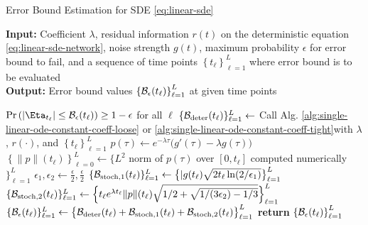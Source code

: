     \begin{algorithm}[!htbp]
        \caption{Error Bound Estimation for SDE \eqref{eq:linear-sde}}\label{alg:sde}
        \textbf{Input:} Coefficient $\lambda$, residual information $r(t)$ on the deterministic equation \eqref{eq:linear-sde-network}, noise strength $g(t)$, maximum probability $\epsilon$ for error bound to fail, and a sequence of time points $\left\{t_\ell\right\}_{\ell=1}^{L}$ where error bound is to be evaluated\\
        \textbf{Output:} Error bound values $\left\{\mathcal{B}_\epsilon(t_\ell)\right\}_{\ell=1}^{L}$ at given time points
        \begin{algorithmic}
            \Ensure $\P{\left|\Eta_{t_\ell}\right| \leq \Bound_\epsilon(t_\ell)} \geq 1 - \epsilon$ for all $\ell$
            \State $\{\mathcal{B}_{\text{deter}}(t_\ell)\}_{\ell=1}^{L} \gets $ {\small Call Alg. }\ref{alg:single-linear-ode-constant-coeff-loose} {\small or }\ref{alg:single-linear-ode-constant-coeff-tight}{\small with } $\lambda${\small, }$r(\cdot)${\small, and }$\left\{t_\ell\right\}_{\ell=1}^{L}$
            \State $p(\tau) \gets e^{-\lambda\tau}\big(g'(\tau) - \lambda g(\tau)\big)$
            \State $\left\{\|p\| (t_\ell)\right\}_{\ell=0}^L \gets \{L^2$ {\small norm of} $p(\tau)$ {\small over} $[0, t_\ell]$ {\small computed numerically} $\}_{\ell=1}^{L}$
            \State $\epsilon_1, \epsilon_2 \gets \frac{\epsilon}{2}, \frac{\epsilon}{2}$ 
            \State $\{\mathcal{B}_{\text{stoch}, 1}(t_\ell)\}_{\ell=1}^{L} \gets \big\{|g(t_\ell) \sqrt{2t_\ell \ln(2/\epsilon_1)}\big\}_{\ell=1}^{L}$
            \State $\{\mathcal{B}_{\text{stoch}, 2}(t_\ell)\}_{\ell=1}^{L} \gets \Big\{t_\ell e^{\lambda t_\ell} \|p\|(t_\ell) \sqrt{1/2+ \sqrt{1/(3\epsilon_2) - 1/3}} \Big\}_{\ell=1}^{L}$
            \State $\{\mathcal{B}_{\epsilon}(t_\ell)\}_{\ell=1}^L \gets \big\{ \mathcal{B}_{\text{deter}}(t_\ell) + \mathcal{B}_{\text{stoch}, 1}(t_\ell) + \mathcal{B}_{\text{stoch}, 2}(t_\ell) \big\}_{\ell=1}^{L}$
            \State \textbf{return} $\left\{\mathcal{B}_\epsilon(t_\ell)\right\}_{\ell=1}^{L}$
        \end{algorithmic}
    \end{algorithm}